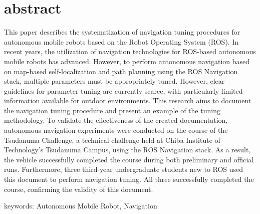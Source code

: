\chapter*{abstract}
\thispagestyle{empty}
%
\begin{center}
  \scalebox{1.3}{Systematization of Navigation Adjustment Procedures}
  \scalebox{1.3}{for ROS-Based Autonomous Mobile Robots}
\end{center}
\vspace{1.0zh}
%
This paper describes the systematization of navigation tuning procedures for autonomous mobile robots based on the Robot Operating System (ROS). 
In recent years, the utilization of navigation technologies for ROS-based autonomous mobile robots has advanced. However, to perform autonomous navigation based on map-based self-localization and path planning using the ROS Navigation stack, multiple parameters must be appropriately tuned. 
However, clear guidelines for parameter tuning are currently scarce, with particularly limited information available for outdoor environments. 
This research aims to document the navigation tuning procedure and present an example of the tuning methodology. 
To validate the effectiveness of the created documentation, autonomous navigation experiments were conducted on the course of the Tsudanuma Challenge, a technical challenge held at Chiba Institute of Technology's Tsudanuma Campus, using the ROS Navigation stack. 
As a result, the vehicle successfully completed the course during both preliminary and official runs. 
Furthermore, three third-year undergraduate students new to ROS used this document to perform navigation tuning. All three successfully completed the course, confirming the validity of this document. 


\vspace{1.0zh}

keywords: Autonomous Mobile Robot, Navigation

